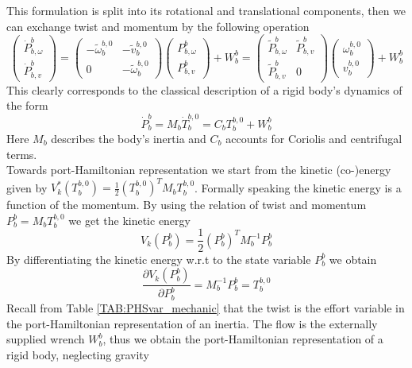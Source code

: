 \documentclass[a4paper,twoside, openright,12pt]{report}
\begin{document}
This formulation is split into its rotational and translational components, then we can exchange twist and momentum by the following operation
\begin{equation}\label{EQ:centripetaldetail}
\begin{pmatrix}
\dot{P}_{b,\omega}^b \\ \dot{P}_{b,v}^b \end{pmatrix} = \begin{pmatrix}
-\tilde{\omega}_b^{b,0} & -\tilde{v}_b^{b,0} \\ 0 & -\tilde{\omega}_b^{b,0}\end{pmatrix} \begin{pmatrix}
P_{b,\omega}^b \\ P_{b,v}^b 
\end{pmatrix} + W_b^b = \begin{pmatrix}
\tilde{P}_{b,\omega}^b & \tilde{P}_{b,v}^b \\ \tilde{P}_{b,v}^b & 0
\end{pmatrix} \begin{pmatrix}
\omega_b^{b,0} \\ v_b^{b,0}
\end{pmatrix} +W_b^b
\end{equation}
This clearly corresponds to the classical description of a rigid body's dynamics of the form
\begin{equation}
	\dot{P}_b^b = M_b \dot{T}_b^{b,0}  = C_b T_b^{b,0} + W_{b}^b
\end{equation}
Here $M_b$ describes the body's inertia and $C_b$ accounts for Coriolis and centrifugal terms.\\
Towards port-Hamiltonian representation we start from the kinetic (co-)energy given by $V_k^*(T_b^{b,0}) =\frac{1}{2}(T_b^{b,0})^T M_b T_b^{b,0}$. Formally speaking the kinetic energy is a function of the momentum. By using the relation of twist and momentum $P_b^b = M_b T_b^{b,0}$ we get the kinetic energy
\begin{equation}
V_k(P_b^b) = \frac{1}{2}(P_b^b)^T M_b^{-1} P_b^b
\end{equation}
By differentiating the kinetic energy w.r.t to the state variable $P_b^b$ we obtain 
\begin{equation}
\frac{\partial V_k(P_b^b)}{\partial P_b^b} = M_b^{-1} P_b^b = T_b^{b,0}
\end{equation}
Recall from Table \ref{TAB:PHSvar_mechanic} that the twist is the effort variable in the port-Hamiltonian representation of an inertia. The flow is the externally supplied wrench $W_b^b$, thus we obtain the port-Hamiltonian representation of a rigid body, neglecting gravity
\end{document}
